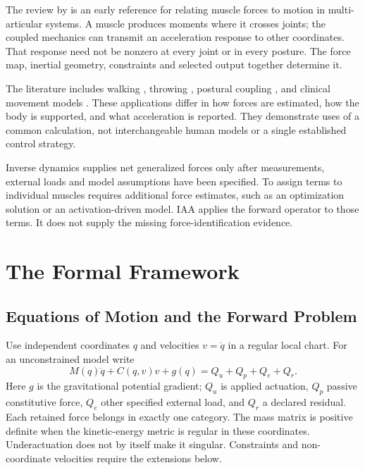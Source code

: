 The review by \cite{ZajacGordon1989} is an early reference for relating muscle forces to motion in multi-articular systems. A muscle produces moments where it crosses joints; the coupled mechanics can transmit an acceleration response to other coordinates. That response need not be nonzero at every joint or in every posture. The force map, inertial geometry, constraints and selected output together determine it.

The literature includes walking \cite{Zajac2002,Zajac2003,Neptune2001,Kepple1997}, throwing \cite{Hirashima2007control,Hirashima2008kinetic,HirashimaOhtsuki2008}, postural coupling \cite{Challis2011}, and clinical movement models \cite{RileyKerrigan1999,Caruthers2016}. These applications differ in how forces are estimated, how the body is supported, and what acceleration is reported. They demonstrate uses of a common calculation, not interchangeable human models or a single established control strategy.

Inverse dynamics supplies net generalized forces only after measurements, external loads and model assumptions have been specified. To assign terms to individual muscles requires additional force estimates, such as an optimization solution or an activation-driven model. IAA applies the forward operator to those terms. It does not supply the missing force-identification evidence.

\section{The Formal Framework}
\label{sec:iaa_formal}

\subsection{Equations of Motion and the Forward Problem}

Use independent coordinates $q$ and velocities $v=\dot q$ in a regular local chart. For an unconstrained model write
\begin{equation}
M(q)\ddot q+C(q,v)v+g(q)=Q_u+Q_p+Q_e+Q_r.
\label{eq:ch3b:eom}
\end{equation}
Here $g$ is the gravitational potential gradient; $Q_u$ is applied actuation, $Q_p$ passive constitutive force, $Q_e$ other specified external load, and $Q_r$ a declared residual. Each retained force belongs in exactly one category. The mass matrix is positive definite when the kinetic-energy metric is regular in these coordinates. Underactuation does not by itself make it singular. Constraints and non-coordinate velocities require the extensions below.

